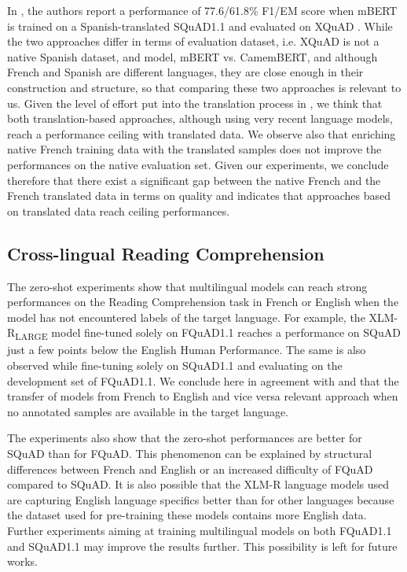 \documentclass{article}
\begin{document}
In \citep{spanishsquad}, the authors report a performance of 77.6/61.8\% F1/EM score when mBERT is trained on a Spanish-translated SQuAD1.1 and evaluated on XQuAD \citep{xquad}.
While the two approaches differ in terms of evaluation dataset, i.e. XQuAD is not a native Spanish dataset, and model, mBERT vs. CamemBERT, and although French and Spanish are different languages, they are close enough in their construction and structure, so that comparing these two approaches is relevant to us.
Given the level of effort put into the translation process in \citep{spanishsquad}, we think that both translation-based approaches, although using very recent language models, reach a performance ceiling with translated data.
We observe also that enriching native French training data with the translated samples does not improve the performances on the native evaluation set.
Given our experiments, we conclude therefore that there exist a significant gap between the native French and the French translated data in terms on quality and indicates that approaches based on translated data reach ceiling performances.

\subsection{Cross-lingual Reading Comprehension}

The zero-shot experiments show that multilingual models can reach strong performances on the Reading Comprehension task in French or English when the model has not encountered labels of the target language.
For example, the XLM-R\textsubscript{LARGE} model fine-tuned solely on FQuAD1.1 reaches a performance on SQuAD just a few points below the English Human Performance.
The same is also observed while fine-tuning solely on SQuAD1.1 and evaluating on the development set of FQuAD1.1.
We conclude here in agreement with \citep{xquad} and \citep{mlqa} that the transfer of models from French to English and vice versa relevant approach when no annotated samples are available in the target language.

The experiments also show that the zero-shot performances are better for SQuAD than for FQuAD.
This phenomenon can be explained by structural differences between French and English or an increased difficulty of FQuAD compared to SQuAD. 
It is also possible that the XLM-R language models used are capturing English language specifics better than for other languages because the dataset used for pre-training these models contains more English data.
Further experiments aiming at training multilingual models on both FQuAD1.1 and SQuAD1.1 may improve the results further.
This possibility is left for future works.
\end{document}
